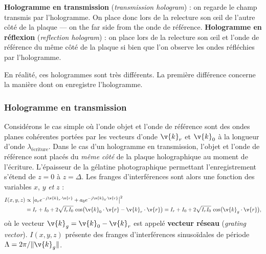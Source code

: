 \begin{definition}
  \textbf{Hologramme en transmission} (\textit{transmission hologram}) : on
  regarde le champ transmis par l'hologramme. On place donc lors de la relecture
  son œil de l'autre côté de la plaque --- on the far side from the onde de
  référence.
  \textbf{Hologramme en réflexion} (\textit{reflection hologram}) : on place lors
  de la relecture son œil et l'onde de référence du même côté de la plaque si
  bien que l'on observe les ondes réfléchies par l'hologramme.
\end{definition}

En réalité, ces hologrammes sont très différents. La première différence
concerne la manière dont on enregistre l'hologramme.

\subsubsection{Hologramme en transmission}
Considérons le cas simple où l'onde objet et l'onde de référence sont des ondes
planes cohérentes portées par les vecteurs d'onde $\v{k}_r$ et $\v{k}_0$ à la
longueur d'onde $\lambda_{\text{écriture}}$. Dans le cas d'un hologramme en
transmission, l'objet et l'onde de référence sont placés du \emph{même côté} de
la plaque holographique au moment de l'écriture. L'épaisseur de la gélatine
photographique permettant l'enregistrement s'étend de $z=0$ à $z=\Delta$. Les
franges d'interférences sont alors une fonction des variables $x$, $y$ \emph{et}
$z$ :
\begin{align*}
  I(x,y,z) &\propto \big|a_r e^{-j\v{k}_r\cdot\v{r}} + a_0 e^{-j\v{k}_0\cdot\v{r}}\big|^2\\
           &= I_r+I_0+2\sqrt{I_r I_0}\,\cos\!\big(\v{k}_0\cdot\v{r}-\v{k}_r\cdot\v{r}\big)
            = I_r+I_0+2\sqrt{I_r I_0}\,\cos\!\big(\v{k}_g\cdot\v{r}\big),
\end{align*}
où le vecteur $\v{k}_g = \v{k}_0-\v{k}_r$ est appelé \textbf{vecteur réseau}
(\textit{grating vector}). $I(x,y,z)$ présente des franges d'interférences
sinusoïdales de période $\Lambda = 2\pi/\|\v{k}_g\|$.

